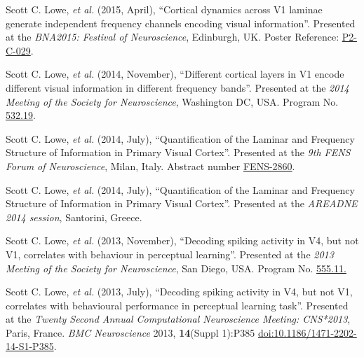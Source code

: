 \documentclass[11pt, a4paper]{article} %
\renewenvironment{itemize}{
  \begin{list}{}{
    \setlength{\leftmargin}{0em}
  }
}{
  \end{list}
}
\begin{document}
\begin{itemize}
%
\item
Scott C. Lowe, \textit{et al.} (2015, April), ``Cortical dynamics across V1 laminae generate independent frequency channels encoding visual information''.
Presented at the \emph{BNA2015: Festival of Neuroscience}, Edinburgh, UK. Poster Reference: \href{http://www.bna.org.uk/static/docs/BNA2015/BNA2015-Abstract-Book.pdf}{P2-C-029}.
%
\item
Scott C. Lowe, \textit{et al.} (2014, November), ``Different cortical layers in V1 encode different visual information in different frequency bands''.
Presented at the \emph{2014 Meeting of the Society for Neuroscience}, Washington DC, USA. Program No. \href{http://www.abstractsonline.com/Plan/ViewAbstract.aspx?sKey=a018159d-9116-492d-b234-b4c53acd5260&cKey=e909b23c-40c3-4371-8816-345dfe3e6c3c&mKey=54c85d94-6d69-4b09-afaa-502c0e680ca7}{532.19}.
%
\item
Scott C. Lowe, \textit{et al.} (2014, July), ``Quantification of the Laminar and Frequency Structure of Information in Primary Visual Cortex''.
Presented at the \emph{9th FENS Forum of Neuroscience}, Milan, Italy. Abstract number \href{http://fens2014.meetingxpert.net/FENS_427/poster_102139/program.aspx}{FENS-2860}.
%
\item
Scott C. Lowe, \textit{et al.} (2014, July), ``Quantification of the Laminar and Frequency Structure of Information in Primary Visual Cortex''.
Presented at the \emph{AREADNE 2014 session}, Santorini, Greece.
%
\item
Scott C. Lowe, \textit{et al.} (2013, November), ``Decoding spiking activity in V4, but not V1, correlates with behaviour in perceptual learning''.
Presented at the \emph{2013 Meeting of the Society for Neuroscience}, San Diego, USA. Program No. \href{http://www.abstractsonline.com/Plan/ViewAbstract.aspx?sKey=a69ca081-1031-4c5e-917c-b57b7b7255cf&cKey=5e73e1d9-7177-4207-9890-3efb2a57985b&mKey=8d2a5bec-4825-4cd6-9439-b42bb151d1cf}{555.11.}
%
\item
Scott C. Lowe, \textit{et al.} (2013, July), ``Decoding spiking activity in V4, but not V1, correlates with behavioural performance in perceptual learning task''.
Presented at the \emph{Twenty Second Annual Computational Neuroscience Meeting: CNS*2013}, Paris, France.
\emph{BMC Neuroscience} 2013, \textbf{14}(Suppl 1):P385  \href{http://dx.doi.org/10.1186/1471-2202-14-S1-P385}{doi:10.1186/1471-2202-14-S1-P385}.
%
\end{itemize}
%
%
\end{document}

